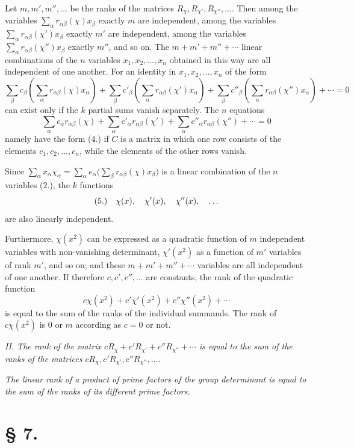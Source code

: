 \documentclass[11pt]{article}
\newcommand{\fnum}[1]{\textup{(\ensuremath{#1}.)}\quad}
\begin{document}
Let $m,m',m'',\ldots$ be the ranks of the matrices $R_\chi,R_{\chi'},R_{\chi''},\ldots$. Then among the variables $\sum_\alpha r_{\alpha\beta}(\chi)x_\beta$ exactly $m$ are independent, among the variables $\sum_\alpha r_{\alpha\beta}(\chi')x_\beta$ exactly $m'$ are independent, among the variables $\sum_\alpha r_{\alpha\beta}(\chi'')x_\beta$ exactly $m''$, and so on. The $m+m'+m''+\cdots$ linear combinations of the $n$ variables $x_1,x_2,\ldots,x_n$ obtained in this way are all independent of one another. For an identity in $x_1,x_2,\ldots,x_n$ of the form
\[
 \sum_\beta c_\beta\left(\sum_\alpha r_{\alpha\beta}(\chi)x_\alpha\right)
+\sum_\beta c'_\beta\left(\sum_\alpha r_{\alpha\beta}(\chi')x_\alpha\right)
+\sum_\beta c''_\beta\left(\sum_\alpha r_{\alpha\beta}(\chi'')x_\alpha\right)+\cdots=0
\]
can exist only if the $k$ partial sums vanish separately. The $n$ equations
\[
 \sum_\alpha c_\alpha r_{\alpha\beta}(\chi)
+\sum_\alpha c'_\alpha r_{\alpha\beta}(\chi')
+\sum_\alpha c''_\alpha r_{\alpha\beta}(\chi'')+\cdots=0
\]
namely have the form (4.) if $C$ is a matrix in which one row consists of the elements $c_1,c_2,\ldots,c_n$, while the elements of the other rows vanish.

Since $\sum_\alpha x_\alpha\chi_\alpha=\sum_\alpha e_\alpha\bigl(\sum_\beta r_{\alpha\beta}(\chi)x_\beta\bigr)$ is a linear combination of the $n$ variables (2.), the $k$ functions
\[
\fnum{5} \chi(x),\quad \chi'(x),\quad \chi''(x),\quad\ldots
\]
are also linearly independent.

Furthermore, $\chi(x^2)$ can be expressed as a quadratic function of $m$ independent variables with non-vanishing determinant, $\chi'(x^2)$ as a function of $m'$ variables of rank $m'$, and so on; and these $m+m'+m''+\cdots$ variables are all independent of one another. If therefore $c,c',c'',\ldots$ are constants, the rank of the quadratic function
\[
 c\chi(x^2)+c'\chi'(x^2)+c''\chi''(x^2)+\cdots
\]
is equal to the sum of the ranks of the individual summands. The rank of $c\chi(x^2)$ is $0$ or $m$ according as $c=0$ or not.

\emph{II. The rank of the matrix $cR_\chi+c'R_{\chi'}+c''R_{\chi''}+\cdots$ is equal to the sum of the ranks of the matrices $cR_\chi,c'R_{\chi'},c''R_{\chi''},\ldots$.}

\emph{The linear rank of a product of prime factors of the group determinant is equal to the sum of the ranks of its different prime factors.}

\section*{§ 7.}
\end{document}
